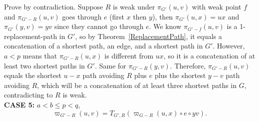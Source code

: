 \documentclass[11pt]{article}
\theoremstyle{plain}
\theoremstyle{definition}
\newcommand{\nng}[3]{\pi_{G'-#3}\left(#1,#2\right)}
\newcommand{\odg}[3]{\varpi_{G-#3}\left(#1,#2\right)}
\newcommand{\ndg}[3]{\varpi_{G'-#3}\left(#1,#2\right)}
\newcommand{\pp}[1]{T_{G',R}\left(#1\right)}
\begin{document}
\begin{center}
 \end{center}

Prove by contradiction. Suppose $R$ is weak under $\pi_{G'}(u,v)$ with weak point $f$ and $\nng{u}{v}{R}$ goes through $e$ (first $x$ then $y$), then $\pi_{G'}(u,x)=ux$ and $\pi_{G'}(y,v)=yv$ since they cannot go through $e$. We know $\nng{u}{v}{f}$ is a 1-replacement-path in $G'$, so by Theorem~\ref{ReplacementPath}, it equals a concatenation of a shortest path, an edge, and a shortest path in $G'$. However, $a<p$ means that $\nng{u}{x}{R}$ is different from $ux$, so it is a concatenation of at least two shortest paths in $G'$. Same for $\nng{y}{v}{R}$. Therefore, $\nng{u}{v}{R}$ equals the shortest $u-x$ path avoiding $R$ plus $e$ plus the shortest $y-v$ path avoiding $R$, which will be a concatenation of at least three shortest paths in $G$, contradicting to $R$ is weak.
\\

\vspace{5pt}
\noindent\textbf{CASE 5:} $a<b\le p<q$,
$$\ndg{u}{v}{R}=\pp{\odg{u}{x}{R}\circ e\circ yv}.$$
\end{document}
